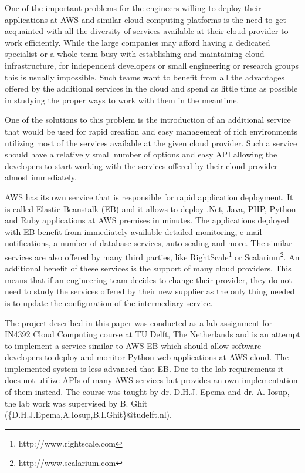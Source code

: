 \documentclass[conference]{IEEEtran}
\begin{document}
One of the important problems for the engineers willing to deploy their applications at AWS and similar cloud computing platforms is the need to get acquainted with all the diversity of services available at their cloud provider to work efficiently. While the large companies may afford having a dedicated specialist or a whole team busy with establishing and maintaining cloud infrastructure, for independent developers or small engineering or research groups this is usually impossible. Such teams want to benefit from all the advantages offered by the additional services in the cloud and spend as little time as possible in studying the proper ways to work with them in the meantime.

One of the solutions to this problem is the introduction of an additional service that would be used for rapid creation and easy management of rich environments utilizing most of the services available at the given cloud provider. Such a service should have a relatively small number of options and easy API allowing the developers to start working with the services offered by their cloud provider almost immediately. 

AWS has its own service that is responsible for rapid application deployment. It is called Elastic Beanstalk (EB) and it allows to deploy .Net, Java, PHP, Python and Ruby applications at AWS premises in minutes. The applications deployed with EB benefit from immediately available detailed monitoring, e-mail notifications, a number of database services, auto-scaling and more. The similar services are also offered by many third parties, like RightScale\footnote{http://www.rightscale.com} or Scalarium\footnote{http://www.scalarium.com}. An additional benefit of these services is the support of many cloud providers. This means that if an engineering team decides to change their provider, they do not need to study the services offered by their new supplier as the only thing needed is to update the configuration of the intermediary service.

The project described in this paper was conducted as a lab assignment for IN4392 Cloud Computing course at TU Delft, The Netherlands and is an attempt to implement a service similar to AWS EB which should allow software developers to deploy and monitor Python web applications at AWS cloud. The implemented system is less advanced that EB. Due to the lab requirements it does not utilize APIs of many AWS services but provides an own implementation of them instead. The course was taught by dr. D.H.J. Epema and dr. A. Iosup, the lab work was supervised by B. Ghit (\{D.H.J.Epema,A.Iosup,B.I.Ghit\}@tudelft.nl).
\end{document}
